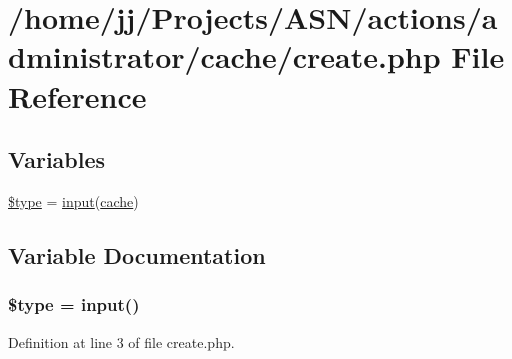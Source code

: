 \hypertarget{create_8php}{}\section{/home/jj/\+Projects/\+A\+S\+N/actions/administrator/cache/create.php File Reference}
\label{create_8php}
\subsection*{Variables}
\begin{DoxyCompactItemize}
\item 
\hyperlink{create_8php_a9a4a6fba2208984cabb3afacadf33919}{\$type} = \hyperlink{ossn_8lib_8input_8php_a64ebee98b041c4f75f71ed3cd73cc8ed}{input}(\textquotesingle{}\hyperlink{jquery_8tokeninput_8js_a521016aa0ca9ff38bfba60ab069cb34b}{cache}\textquotesingle{})
\end{DoxyCompactItemize}


\subsection{Variable Documentation}
\subsubsection[{\texorpdfstring{\$type}{$type}}]{\setlength{\rightskip}{0pt plus 5cm}\${\bf type} = {\bf input}(\textquotesingle{})}\hypertarget{create_8php_a9a4a6fba2208984cabb3afacadf33919}{}\label{create_8php_a9a4a6fba2208984cabb3afacadf33919}


Definition at line 3 of file create.\+php.

